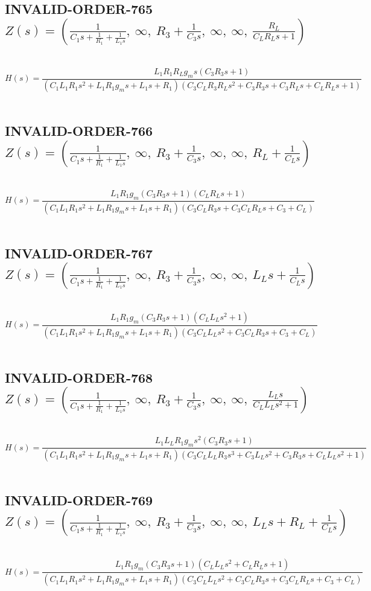 \documentclass{article}
\begin{document}
\subsection{INVALID-ORDER-765 $Z(s) = \left( \frac{1}{C_{1} s + \frac{1}{R_{1}} + \frac{1}{L_{1} s}}, \  \infty, \  R_{3} + \frac{1}{C_{3} s}, \  \infty, \  \infty, \  \frac{R_{L}}{C_{L} R_{L} s + 1}\right)$ } \ 
\textbf{\[H(s) = \frac{L_{1} R_{1} R_{L} g_{m} s \left(C_{3} R_{3} s + 1\right)}{\left(C_{1} L_{1} R_{1} s^{2} + L_{1} R_{1} g_{m} s + L_{1} s + R_{1}\right) \left(C_{3} C_{L} R_{3} R_{L} s^{2} + C_{3} R_{3} s + C_{3} R_{L} s + C_{L} R_{L} s + 1\right)}\] } \ 
\subsection{INVALID-ORDER-766 $Z(s) = \left( \frac{1}{C_{1} s + \frac{1}{R_{1}} + \frac{1}{L_{1} s}}, \  \infty, \  R_{3} + \frac{1}{C_{3} s}, \  \infty, \  \infty, \  R_{L} + \frac{1}{C_{L} s}\right)$ } \ 
\textbf{\[H(s) = \frac{L_{1} R_{1} g_{m} \left(C_{3} R_{3} s + 1\right) \left(C_{L} R_{L} s + 1\right)}{\left(C_{1} L_{1} R_{1} s^{2} + L_{1} R_{1} g_{m} s + L_{1} s + R_{1}\right) \left(C_{3} C_{L} R_{3} s + C_{3} C_{L} R_{L} s + C_{3} + C_{L}\right)}\] } \ 
\subsection{INVALID-ORDER-767 $Z(s) = \left( \frac{1}{C_{1} s + \frac{1}{R_{1}} + \frac{1}{L_{1} s}}, \  \infty, \  R_{3} + \frac{1}{C_{3} s}, \  \infty, \  \infty, \  L_{L} s + \frac{1}{C_{L} s}\right)$ } \ 
\textbf{\[H(s) = \frac{L_{1} R_{1} g_{m} \left(C_{3} R_{3} s + 1\right) \left(C_{L} L_{L} s^{2} + 1\right)}{\left(C_{1} L_{1} R_{1} s^{2} + L_{1} R_{1} g_{m} s + L_{1} s + R_{1}\right) \left(C_{3} C_{L} L_{L} s^{2} + C_{3} C_{L} R_{3} s + C_{3} + C_{L}\right)}\] } \ 
\subsection{INVALID-ORDER-768 $Z(s) = \left( \frac{1}{C_{1} s + \frac{1}{R_{1}} + \frac{1}{L_{1} s}}, \  \infty, \  R_{3} + \frac{1}{C_{3} s}, \  \infty, \  \infty, \  \frac{L_{L} s}{C_{L} L_{L} s^{2} + 1}\right)$ } \ 
\textbf{\[H(s) = \frac{L_{1} L_{L} R_{1} g_{m} s^{2} \left(C_{3} R_{3} s + 1\right)}{\left(C_{1} L_{1} R_{1} s^{2} + L_{1} R_{1} g_{m} s + L_{1} s + R_{1}\right) \left(C_{3} C_{L} L_{L} R_{3} s^{3} + C_{3} L_{L} s^{2} + C_{3} R_{3} s + C_{L} L_{L} s^{2} + 1\right)}\] } \ 
\subsection{INVALID-ORDER-769 $Z(s) = \left( \frac{1}{C_{1} s + \frac{1}{R_{1}} + \frac{1}{L_{1} s}}, \  \infty, \  R_{3} + \frac{1}{C_{3} s}, \  \infty, \  \infty, \  L_{L} s + R_{L} + \frac{1}{C_{L} s}\right)$ } \ 
\textbf{\[H(s) = \frac{L_{1} R_{1} g_{m} \left(C_{3} R_{3} s + 1\right) \left(C_{L} L_{L} s^{2} + C_{L} R_{L} s + 1\right)}{\left(C_{1} L_{1} R_{1} s^{2} + L_{1} R_{1} g_{m} s + L_{1} s + R_{1}\right) \left(C_{3} C_{L} L_{L} s^{2} + C_{3} C_{L} R_{3} s + C_{3} C_{L} R_{L} s + C_{3} + C_{L}\right)}\] } \ 
\end{document}
